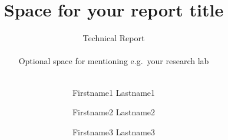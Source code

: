 \documentclass[a4paper,oneside,10pt,ngerman,english]{scrartcl}
\begin{document}

\title{Space for your report title}


\subtitle{Technical Report\\%
    \hfill\\%
    Optional space for mentioning e.g.\ your research lab\\
    \hfill\\%
}

\author{%
    Firstname1 Lastname1 \and Firstname2 Lastname2 \and Firstname3 Lastname3
    \authornewline
    \authornewline
}






\end{document}
